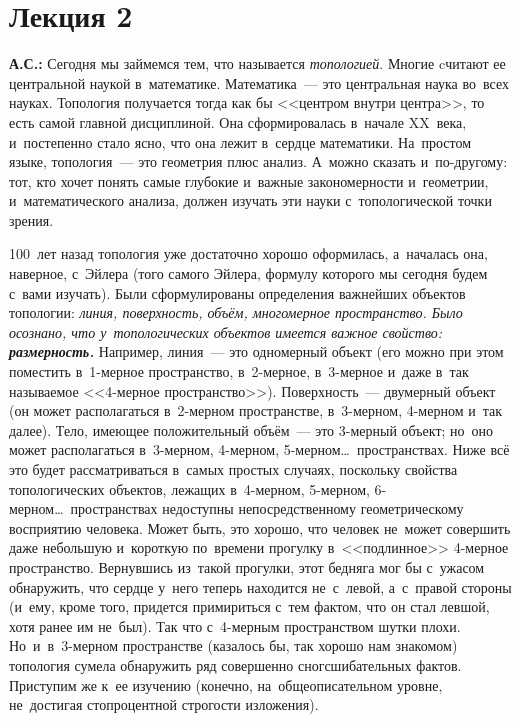 \section{Лекция 2}
\label{1.2}

\textbf{А.С.:} Сегодня мы займемся тем, что называется \textit{топологией}. Многие cчитают ее центральной наукой
в~математике. Математика~--- это центральная наука во~всех науках. Топология получается тогда как бы  <<центром
внутри центра>>, то есть самой главной дисциплиной.
 Она сформировалась в~начале XX~века,
и~постепенно стало ясно, что она лежит в~сердце математики. На~простом языке, топология~--- это
геометрия плюс анализ. А~можно сказать и~по-другому: тот, кто хочет понять самые глубокие и~важные
закономерности и~геометрии, и~математического анализа, должен изучать эти науки с~топологической
точки зрения.

{

100~лет назад топология уже достаточно хорошо оформилась, а~началась она, наверное, с~Эйлера (того
самого Эйлера, формулу которого мы сегодня будем с~вами изучать). Были сформулированы определения
важнейших объектов топологии: \textit{линия, поверхность, объём, многомерное пространство. Было осознано,
что у~топологических объектов имеется важное свойство: \textbf{размерность.}} Например, линия~--- это
одномерный объект (его можно при этом поместить в~1-мерное пространство, в~2-мерное, в~3-мерное и~даже
в~так называемое <<4-мерное пространство>>). Поверхность~--- двумерный объект (он может
располагаться в~2-мерном пространстве, в~3-мерном, 4-мерном и~так далее).
 Тело, имеющее
положительный объём~--- это 3-мерный объект; но~оно может располагаться в~3-мерном, 4-мерном,
5-мерном\ldots\ пространствах. Ниже всё это будет рассматриваться в~самых простых случаях, поскольку
свойства топологических объектов, лежащих в~4-мерном, 5-мерном, 6-мерном\ldots\ пространствах недоступны
непосредственному геометрическому восприятию человека. Может быть, это хорошо, что человек не~может
совершить даже небольшую и~короткую по~времени прогулку в~<<подлинное>> 4-мерное пространство.
Вернувшись из~такой прогулки, этот бедняга мог бы с~ужасом обнаружить, что сердце у~него теперь
находится не~с~левой, а~с~правой стороны (и~ему, кроме того, придется примириться с~тем фактом, что
он стал левшой, хотя ранее им не~был).
 Так что с~4-мерным пространством шутки плохи.
Но~и~в~3-мерном пространстве (казалось бы, так хорошо нам знакомом) топология сумела обнаружить ряд
совершенно сногсшибательных фактов. Приступим же к~ее изучению (конечно, на~общеописательном
уровне, не~достигая стопроцентной строгости изложения).

}

